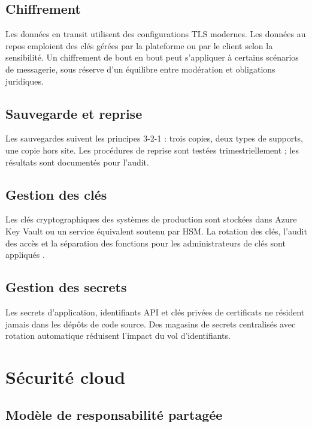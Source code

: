 \subsection{Chiffrement}

Les données en transit utilisent des configurations TLS modernes. Les données au repos emploient des clés gérées par la plateforme ou par le client selon la sensibilité. Un chiffrement de bout en bout peut s'appliquer à certains scénarios de messagerie, sous réserve d'un équilibre entre modération et obligations juridiques.

\subsection{Sauvegarde et reprise}

Les sauvegardes suivent les principes 3-2-1 : trois copies, deux types de supports, une copie hors site. Les procédures de reprise sont testées trimestriellement ; les résultats sont documentés pour l'audit.

\subsection{Gestion des clés}

Les clés cryptographiques des systèmes de production sont stockées dans Azure Key Vault ou un service équivalent soutenu par HSM. La rotation des clés, l'audit des accès et la séparation des fonctions pour les administrateurs de clés sont appliqués \parencite{microsoftKeyVault}.

\subsection{Gestion des secrets}

Les secrets d'application, identifiants API et clés privées de certificats ne résident jamais dans les dépôts de code source. Des magasins de secrets centralisés avec rotation automatique réduisent l'impact du vol d'identifiants.

\section{Sécurité cloud}

\subsection{Modèle de responsabilité partagée}

